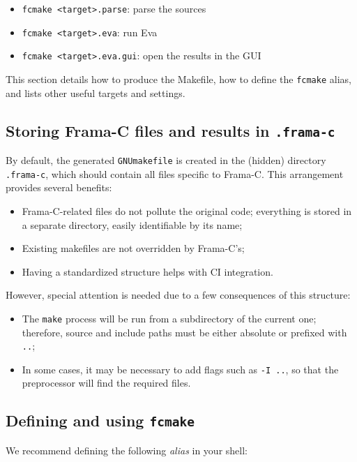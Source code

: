 \begin{itemize}
\item \texttt{fcmake <target>.parse}: parse the sources
\item \texttt{fcmake <target>.eva}: run Eva
\item \texttt{fcmake <target>.eva.gui}: open the results in the GUI
\end{itemize}

This section details how to produce the Makefile, how to define the
\texttt{fcmake} alias, and lists other useful targets and settings.

\subsection*{Storing Frama-C files and results in \texttt{.frama-c}}

By default, the generated \texttt{GNUmakefile} is created in the (hidden)
directory \texttt{.frama-c}, which should contain all files specific to Frama-C.
This arrangement provides several benefits:

\begin{itemize}
\item Frama-C-related files do not pollute the original code; everything
  is stored in a separate directory, easily identifiable by its name;
\item Existing makefiles are not overridden by Frama-C's;
\item Having a standardized structure helps with CI integration.
\end{itemize}

However, special attention is needed due to a few consequences of this
structure:

\begin{itemize}
\item The \texttt{make} process will be run from a subdirectory of the
  current one; therefore, source and include paths must be either absolute
  or prefixed with \texttt{..};
\item In some cases, it may be necessary to add flags such as \texttt{-I ..},
  so that the preprocessor will find the required files.
\end{itemize}

\subsection*{Defining and using \texttt{fcmake}}

We recommend defining the following {\em alias} in your shell:

